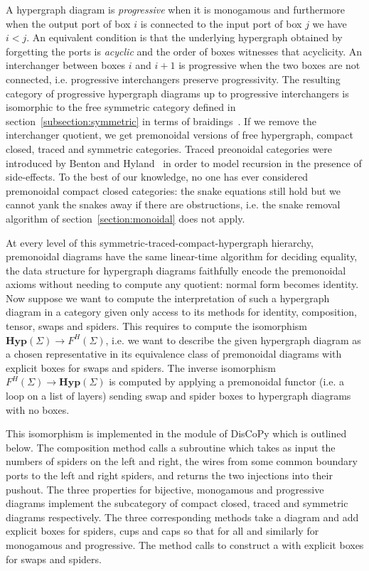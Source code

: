 A hypergraph diagram is \emph{progressive} when it is monogamous and furthermore when the output port of box $i$ is connected to the input port of box $j$ we have $i < j$.
An equivalent condition is that the underlying hypergraph obtained by forgetting the ports is \emph{acyclic} and the order of boxes witnesses that acyclicity.
An interchanger between boxes $i$ and $i + 1$ is progressive when the two boxes are not connected, i.e. progressive interchangers preserve progressivity.
The resulting category of progressive hypergraph diagrams up to progressive interchangers is isomorphic to the free symmetric category defined in section~\ref{subsection:symmetric} in terms of braidings~\cite[Theorem~3.12]{BonchiEtAl16}.
If we remove the interchanger quotient, we get premonoidal versions of free hypergraph, compact closed, traced and symmetric categories.
Traced preonoidal categories were introduced by Benton and Hyland~\cite{BentonHyland03} in order to model recursion in the presence of side-effects.
To the best of our knowledge, no one has ever considered premonoidal compact closed categories: the snake equations still hold but we cannot yank the snakes away if there are obstructions, i.e. the snake removal algorithm of section~\ref{section:monoidal} does not apply.

At every level of this symmetric-traced-compact-hypergraph hierarchy, premonoidal diagrams have the same linear-time algorithm for deciding equality, the data structure for hypergraph diagrams faithfully encode the premonoidal axioms without needing to compute any quotient: normal form becomes identity.
Now suppose we want to compute the interpretation of such a hypergraph diagram in a category given only access to its methods for identity, composition, tensor, swaps and spiders.
This requires to compute the isomorphism $\mathbf{Hyp}(\Sigma) \to F^H(\Sigma)$, i.e. we want to describe the given hypergraph diagram as a chosen representative in its equivalence class of premonoidal diagrams with explicit boxes for swaps and spiders.
The inverse isomorphism $F^H(\Sigma) \to \mathbf{Hyp}(\Sigma)$ is computed by applying a premonoidal functor (i.e. a  loop on a list of layers) sending swap and spider boxes to hypergraph diagrams with no boxes.

This isomorphism is implemented in the  module of DisCoPy which is outlined below.
The composition method calls a  subroutine which takes as input the numbers of spiders on the left and right, the wires from some common boundary ports to the left and right spiders, and returns the two injections into their pushout.
The three properties for bijective, monogamous and progressive diagrams implement the subcategory of compact closed, traced and symmetric diagrams respectively.
The three corresponding methods take a diagram and add explicit boxes for spiders, cups and caps so that  for all  and similarly for monogamous and progressive.
The  method calls  to construct a  with explicit boxes for swaps and spiders.

